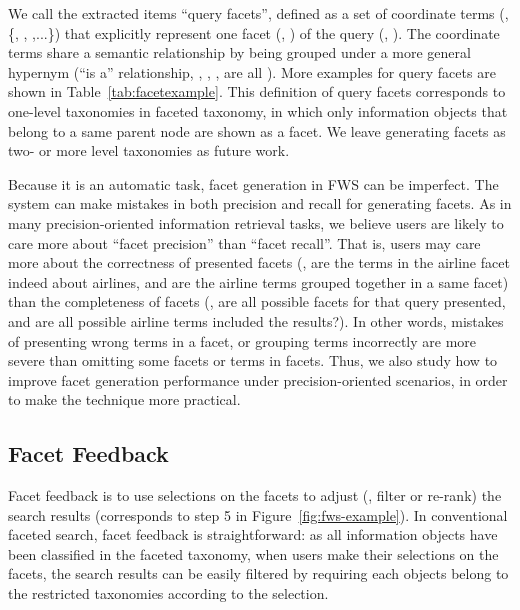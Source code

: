 We call the extracted items ``query facets'', defined as a set of coordinate terms (\eg, \{, , ,...\}) that explicitly represent one facet (\eg, ) of the query (\eg, ). The coordinate terms share a semantic relationship by being grouped under a more general hypernym (``is a'' relationship, \eg, , ,  are all ). More examples for query facets are shown in Table~\ref{tab:facetexample}. This definition of query facets corresponds to one-level taxonomies in faceted taxonomy, in which only information objects that belong to a same parent node are shown as a facet. We leave generating facets as two- or more level taxonomies as future work.

Because it is an automatic task, facet generation in FWS can be imperfect. The system can make mistakes in both precision and recall for generating facets. As in many precision-oriented information retrieval tasks, we believe users are likely to care more about ``facet precision'' than ``facet recall''. That is, users may care more about the correctness of presented facets (\eg, are the terms in the airline facet indeed about airlines, and are the airline terms grouped together in a same facet) than the completeness of facets (\eg, are all possible facets for that query presented, and are all possible airline terms included the results?). In other words, mistakes of presenting wrong terms in a facet, or grouping terms incorrectly are more severe than omitting some facets or terms in facets. Thus, we also study how to improve facet generation performance under precision-oriented scenarios, in order to make the technique more practical.

\subsection{Facet Feedback}
Facet feedback is to use selections on the facets to adjust (\eg, filter or re-rank) the search results (corresponds to step 5 in Figure~\ref{fig:fws-example}). In conventional faceted search, facet feedback is straightforward: as all information objects have been classified in the faceted taxonomy, when users make their selections on the facets, the search results can be easily filtered by requiring each objects belong to the restricted taxonomies according to the selection.

